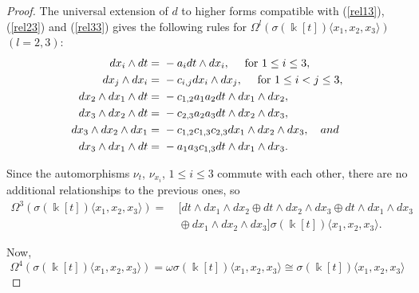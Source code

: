 \documentclass{amsart}
\theoremstyle{definition}
\theoremstyle{remark}
\numberwithin{equation}{section}
\begin{document}
\begin{proof}
The universal extension of $d$ to higher forms compatible with {\rm (}\ref{rel13}{\rm )}, {\rm (}\ref{rel23}{\rm )} and {\rm (}\ref{rel33}{\rm )} gives the following rules for $\Omega^l(\sigma(\Bbbk[t])\langle x_1, x_2, x_3\rangle)$ $(l = 2, 3)$:
\begin{align}\label{rel3wedge}
 dx_i\wedge dt = &\ -a_idt\wedge dx_i, \quad \text{ for } 1\leq i \leq 3, \notag \\
 dx_j\wedge dx_i = &\ -c_{i,j}dx_i\wedge dx_j, \quad \text{ for } 1\leq i < j \leq 3, \notag \\
dx_2\wedge dx_1\wedge dt = &\ -c_{1,2}a_1a_2dt\wedge dx_1\wedge dx_2,  \\
dx_3\wedge dx_2\wedge dt = &\ -c_{2,3}a_2a_3dt\wedge dx_2\wedge dx_3,  \notag \\
dx_3\wedge dx_2\wedge dx_1 = &\ -c_{1,2}c_{1,3}c_{2,3}dx_1\wedge dx_2\wedge dx_3, \quad {\rm and} \notag \\
dx_3\wedge dx_1\wedge dt = &\ -a_{1}a_{3}c_{1,3}dt\wedge dx_1\wedge dx_3. \notag
\end{align}

Since the automorphisms $\nu_{t}$, $\nu_{x_i}$, $1\leq i \leq 3$ commute with each other, there are no additional relationships to the previous ones, so
\begin{align*}
\Omega^{3}(\sigma(\Bbbk[t])\langle x_1, x_2, x_3\rangle) = &\ [dt\wedge dx_1\wedge dx_2 \oplus dt\wedge dx_2\wedge dx_3 \oplus dt\wedge dx_1\wedge dx_3 \\
&\ \oplus dx_1\wedge dx_2\wedge dx_3] \sigma(\Bbbk[t])\langle x_1, x_2, x_3\rangle.
\end{align*}

Now, 
$$
\Omega^4(\sigma(\Bbbk[t])\langle x_1, x_2, x_3\rangle) = \omega\sigma(\Bbbk[t])\langle x_1, x_2, x_3\rangle\cong \sigma(\Bbbk[t])\langle x_1, x_2, x_3\rangle
$$ 


\end{proof}
\end{document}
